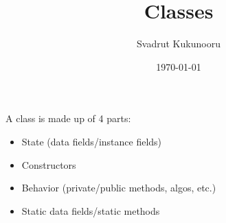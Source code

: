 \documentclass[letterpaper]{report}
\title{Classes}
\author{Svadrut Kukunooru}
\date{\today}
\begin{document}
\begin{titlepage}
    \maketitle
\end{titlepage}
A class is made up of 4 parts: 
\begin{itemize}
    \item State (data fields/instance fields)
    \item Constructors
    \item Behavior (private/public methods, algos, etc.)
    \item Static data fields/static methods
\end{itemize}
\end{document}
